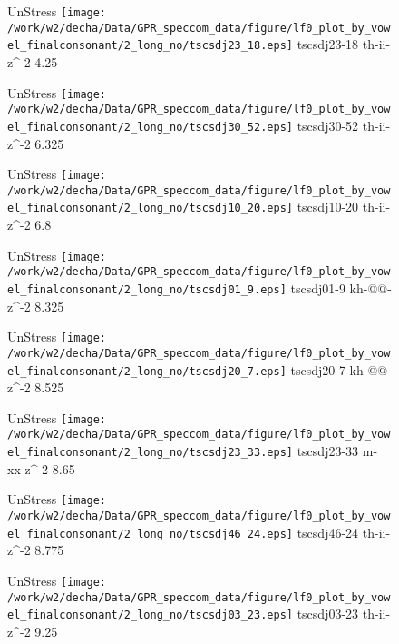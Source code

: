 \documentclass{article}
\begin{document}
\begin{figure}[t]
\begin{minipage}[b]{.24\textwidth}
UnStress
\centering
\texttt{[image: /work/w2/decha/Data/GPR\_speccom\_data/figure/lf0\_plot\_by\_vowel\_finalconsonant/2\_long\_no/tscsdj23\_18.eps]}
tscsdj23-18 th-ii-z\textasciicircum-2 4.25
\end{minipage}
\begin{minipage}[b]{.24\textwidth}
UnStress
\centering
\texttt{[image: /work/w2/decha/Data/GPR\_speccom\_data/figure/lf0\_plot\_by\_vowel\_finalconsonant/2\_long\_no/tscsdj30\_52.eps]}
tscsdj30-52 th-ii-z\textasciicircum-2 6.325
\end{minipage}
\begin{minipage}[b]{.24\textwidth}
UnStress
\centering
\texttt{[image: /work/w2/decha/Data/GPR\_speccom\_data/figure/lf0\_plot\_by\_vowel\_finalconsonant/2\_long\_no/tscsdj10\_20.eps]}
tscsdj10-20 th-ii-z\textasciicircum-2 6.8
\end{minipage}
\begin{minipage}[b]{.24\textwidth}
UnStress
\centering
\texttt{[image: /work/w2/decha/Data/GPR\_speccom\_data/figure/lf0\_plot\_by\_vowel\_finalconsonant/2\_long\_no/tscsdj01\_9.eps]}
tscsdj01-9 kh-@@-z\textasciicircum-2 8.325
\end{minipage}
\end{figure}

\begin{figure}[t]
\begin{minipage}[b]{.24\textwidth}
UnStress
\centering
\texttt{[image: /work/w2/decha/Data/GPR\_speccom\_data/figure/lf0\_plot\_by\_vowel\_finalconsonant/2\_long\_no/tscsdj20\_7.eps]}
tscsdj20-7 kh-@@-z\textasciicircum-2 8.525
\end{minipage}
\begin{minipage}[b]{.24\textwidth}
UnStress
\centering
\texttt{[image: /work/w2/decha/Data/GPR\_speccom\_data/figure/lf0\_plot\_by\_vowel\_finalconsonant/2\_long\_no/tscsdj23\_33.eps]}
tscsdj23-33 m-xx-z\textasciicircum-2 8.65
\end{minipage}
\begin{minipage}[b]{.24\textwidth}
UnStress
\centering
\texttt{[image: /work/w2/decha/Data/GPR\_speccom\_data/figure/lf0\_plot\_by\_vowel\_finalconsonant/2\_long\_no/tscsdj46\_24.eps]}
tscsdj46-24 th-ii-z\textasciicircum-2 8.775
\end{minipage}
\begin{minipage}[b]{.24\textwidth}
UnStress
\centering
\texttt{[image: /work/w2/decha/Data/GPR\_speccom\_data/figure/lf0\_plot\_by\_vowel\_finalconsonant/2\_long\_no/tscsdj03\_23.eps]}
tscsdj03-23 th-ii-z\textasciicircum-2 9.25
\end{minipage}
\end{figure}
\end{document}
